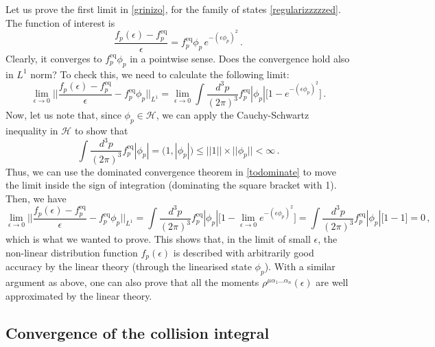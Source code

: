 \documentclass[a4paper, amsfonts, amssymb, amsmath, reprint, showkeys, nofootinbib, twoside, onecolumn,notitlepage,,longbibliography]{revtex4-2}
\theoremstyle{definition}
\theoremstyle{theorem}
\theoremstyle{corollary}
\begin{document}
Let us prove the first limit in \eqref{grinizo}, for the family of states \eqref{regularizzzzzed}. The function of interest is
\begin{equation}
\dfrac{f_p(\epsilon){-}f^{\text{eq}}_p}{\epsilon} = f^{\text{eq}}_p \phi_p \, e^{-(\epsilon \phi_p)^2} \, .
\end{equation}
Clearly, it converges to $f^{\text{eq}}_p\phi_p$ in a pointwise sense. Does the convergence hold also in $L^1$ norm? To check this, we need to calculate the following limit:
\begin{equation}\label{todominate}
\lim_{\epsilon \rightarrow 0} \bigg|\bigg| \dfrac{f_p(\epsilon)-f_p^{\text{eq}}}{\epsilon} - f^{\text{eq}}_p\phi_p \bigg| \bigg|_{L^1}  = \lim_{\epsilon \rightarrow 0} \int \dfrac{d^3 p}{(2\pi)^3}  f^{\text{eq}}_p |\phi_p| \bigg[1- e^{-(\epsilon \phi_p)^2}\bigg] \, .
\end{equation}
Now, let us note that, since $\phi_p \in \mathcal{H}$, we can apply the Cauchy-Schwartz inequality in $\mathcal{H}$ to show that 
\begin{equation}
\int \dfrac{d^3 p}{(2\pi)^3} f^{\text{eq}}_p |\phi_p| =\big(1,|\phi_p| \big) \leq ||1|| \times  ||\phi_p ||<\infty \, .
\end{equation}
Thus, we can use the dominated convergence theorem in \eqref{todominate} to move the limit inside the sign of integration (dominating the square bracket with 1). Then, we have
\begin{equation}
\lim_{\epsilon \rightarrow 0} \bigg|\bigg| \dfrac{f_p(\epsilon)-f_p^\text{eq}}{\epsilon} - f^{\text{eq}}_p\phi_p \bigg| \bigg|_{L^1}  = \int \dfrac{d^3 p}{(2\pi)^3}  f^{\text{eq}}_p |\phi_p| \bigg[1- \lim_{\epsilon \rightarrow 0} e^{-(\epsilon \phi_p)^2}\bigg] = \int \dfrac{d^3 p}{(2\pi)^3} f^{\text{eq}}_p |\phi_p| \bigg[1- 1\bigg]=0\, ,
\end{equation}
which is what we wanted to prove. This shows that, in the limit of small $\epsilon$, the non-linear distribution function $f_p(\epsilon)$ is described with arbitrarily good accuracy by the linear theory (through the linearised state $\phi_p$). With a similar argument as above, one can also prove that all the moments $\rho^{\mu \alpha_1 ... \alpha_n}(\epsilon)$ are well approximated by the linear theory.

\vspace{-0.2cm}
\subsection{Convergence of the collision integral}
\vspace{-0.2cm}
\end{document}
